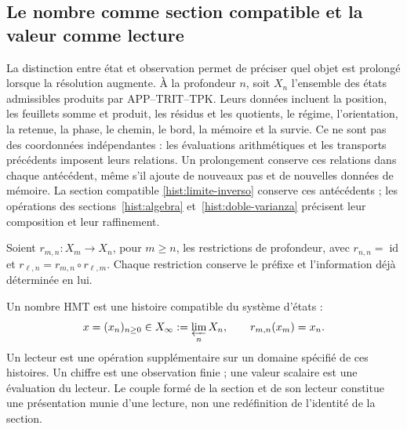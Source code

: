 
\subsection{Le nombre comme section compatible et la valeur comme lecture}
\label{hist:seccion}

La distinction entre état et observation permet de préciser quel objet est
prolongé lorsque la résolution augmente. À la profondeur \(n\), soit \(X_n\)
l’ensemble des états admissibles produits par APP--TRIT--TPK. Leurs données
incluent la position, les feuillets somme et produit, les résidus et les quotients, le régime,
l’orientation, la retenue, la phase, le chemin, le bord, la mémoire et la survie. Ce ne sont pas
des coordonnées indépendantes : les évaluations arithmétiques et les transports
précédents imposent leurs relations. Un prolongement conserve ces relations
dans chaque antécédent, même s’il ajoute de nouveaux pas et de nouvelles données de mémoire.
La section compatible \eqref{hist:limite-inverso} conserve ces
antécédents ; les opérations des sections~\ref{hist:algebra}
et~\ref{hist:doble-varianza} précisent leur composition et leur raffinement.

Soient \(r_{m,n}:X_m\to X_n\), pour \(m\geq n\), les restrictions de
profondeur, avec \(r_{n,n}=\operatorname{id}\) et
\(r_{\ell,n}=r_{m,n}\circ r_{\ell,m}\). Chaque restriction conserve le
préfixe et l’information déjà déterminée en lui.

\begin{definition}
Un nombre HMT est une histoire compatible du système d’états :
\begin{equation}
 x=(x_n)_{n\geq0}\in X_\infty:=\varprojlim_n X_n,
 \qquad r_{m,n}(x_m)=x_n.
 \label{hist:limite-inverso}
\end{equation}
Un lecteur est une opération supplémentaire sur un domaine spécifié de ces
histoires. Un chiffre est une observation finie ; une valeur scalaire est une
évaluation du lecteur. Le couple formé de la section et de son lecteur constitue
une présentation munie d’une lecture, non une redéfinition de l’identité de la section.
\end{definition}

